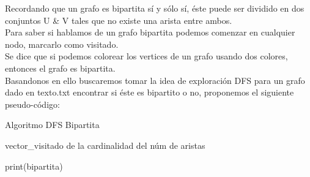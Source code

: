 \documentclass{article}
\begin{document}
Recordando que un grafo es bipartita sí y sólo sí, éste puede ser dividido en dos conjuntos U \& V tales que no existe una arista entre ambos.\\

Para saber si hablamos de un grafo bipartita podemos comenzar en cualquier nodo, marcarlo como visitado.\\ Se dice que si podemos colorear los vertices de un grafo usando dos colores, entonces el grafo es bipartita.\\

Basandonos en ello buscaremos tomar la idea de exploración DFS para un grafo dado en texto.txt encontrar si éste es bipartito o no, proponemos el siguiente pseudo-código:


\begin{center}
  \begin{minipage}{0.7\linewidth} %
    \begin{algorithm}[H] 
      \SetAlgoLined
      \DontPrintSemicolon
      \caption{Algoritmo DFS Bipartita}
      \label{alg:loop}

      
      vector\_visitado de la cardinalidad del núm de aristas\\

      print(bipartita)
      
    \end{algorithm}
  \end{minipage}
\end{center}
\end{document}

